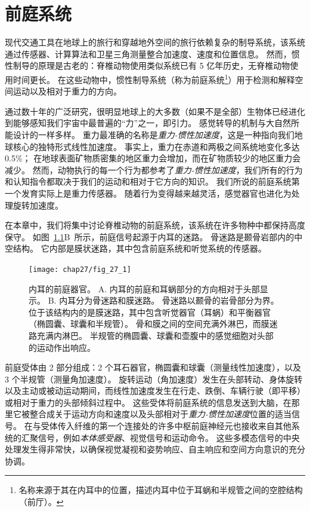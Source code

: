 \chapter{前庭系统} \label{chap:chap27}

现代交通工具在地球上的旅行和穿越地外空间的旅行依赖复杂的制导系统，该系统通过传感器、计算算法和卫星三角测量整合加速度、速度和位置信息。
然而，惯性制导的原理是古老的：脊椎动物使用类似系统已有 5 亿年历史，无脊椎动物使用时间更长。
在这些动物中，惯性制导系统（称为前庭系统\footnote{名称来源于其在内耳中的位置，描述内耳中位于耳蜗和半规管之间的空腔结构（前厅）。}）用于检测和解释空间运动以及相对于重力的方向。


通过数十年的广泛研究，很明显地球上的大多数（如果不是全部）生物体已经进化到能够感知我们宇宙中最普遍的“力”之一，即引力。
感觉转导的机制与大自然所能设计的一样多样。
重力最准确的名称是\textit{重力-惯性加速度}，这是一种指向我们地球核心的独特形式线性加速度。
事实上，重力在赤道和两极之间系统地变化多达 0.5\%；
在地球表面矿物质密集的地区重力会增加，而在矿物质较少的地区重力会减少。
然而，动物执行的每一个行为都参考了\textit{重力-惯性加速度}，我们所有的行为和认知指令都取决于我们的运动和相对于它方向的知识。
我们所说的前庭系统第一个发育实际上是重力传感器。
随着行为变得越来越灵活，感觉器官也进化为处理旋转加速度。


在本章中，我们将集中讨论脊椎动物的前庭系统，该系统在许多物种中都保持高度保守。
如图~\ref{fig:27_1}B~所示，前庭信号起源于内耳的迷路。
骨迷路是颞骨岩部内的中空结构。
它内部是膜状迷路，其中包含前庭系统和听觉系统的传感器。


\begin{figure}[htbp]
	\centering
	\texttt{[image: chap27/fig\_27\_1]}
	\caption{内耳的前庭器官。
		A. 内耳的前庭和耳蜗部分的方向相对于头部显示。
		B. 内耳分为骨迷路和膜迷路。
		骨迷路以颞骨的岩骨部分为界。
		位于该结构内的是膜迷路，其中包含听觉器官（耳蜗）和平衡器官（椭圆囊、球囊和半规管）。
		骨和膜之间的空间充满外淋巴，而膜迷路充满内淋巴。
		半规管的椭圆囊、球囊和壶腹中的感觉细胞对头部的运动作出响应\cite{iurato2013submicroscopic}。}
	\label{fig:27_1}
\end{figure}


前庭受体由 2 部分组成：2 个耳石器官，椭圆囊和球囊（测量线性加速度），以及 3 个半规管（测量角加速度）。
旋转运动（角加速度）发生在头部转动、身体旋转以及主动或被动运动期间，而线性加速度发生在行走、跌倒、车辆行驶（即平移）或相对于重力的头部倾斜过程中。
这些受体将前庭系统的信息发送到大脑，在那里它被整合成关于运动方向和速度以及头部相对于\textit{重力-惯性加速度}位置的适当信号。
在与受体传入纤维的第一个连接处的许多中枢前庭神经元也接收来自其他系统的汇聚信号，例如\textit{本体感受器}、视觉信号和运动命令。
这些多模态信号的中央处理发生得非常快，以确保视觉凝视和姿势响应、自主响应和空间方向意识的充分协调。



